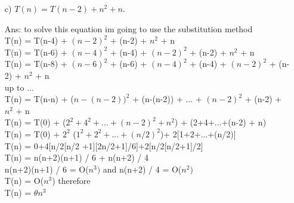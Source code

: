 \documentclass[10pt,letterpaper]{article}
\begin{document}
\begin{itemize}
\item[{c)}] $T(n)=T(n-2)+n^2 +n$.   
\item[Ans: ] to solve this equation im going to use the substitution method\\
T(n) = T(n-4) + $(n-2)^2$ + (n-2) + $n^2$ + n\\
T(n) = T(n-6) + $(n-4)^2$ + (n-4) + $(n-2)^2$ + (n-2) + $n^2$ + n\\
T(n) = T(n-8) + $(n-6)^2$ + (n-6) + $(n-4)^2$ + (n-4) + $(n-2)^2$ + (n-2) + $n^2$ + n\\
up to ...\\
T(n) = T(n-n) + ($n-(n-2))^2$ + (n-(n-2)) + ... + $(n-2)^2$ + (n-2) + $n^2$ + n\\
T(n) = T(0) + ($2^2 + 4^2 + ... + (n-2)^2 + n^2$) + (2+4+...+(n-2) + n)\\
T(n) = T(0) + $2^2$ ($1^2 + 2^2 + ... + (n/2)^2$)+ 2[1+2+...+(n/2)]\\
T(n) = 0+4[n/2[n/2 +1][2n/2+1]/6]+2[n/2[n/2+1]/2]\\

T(n) = n(n+2)(n+1) / 6 + n(n+2) / 4\\
n(n+2)(n+1) / 6 = O($n^3)$ and n(n+2) / 4 = O($n^2)$\\
T(n) = O($n^3$) therefore \\
T(n) = $\theta n^3$\\

\end{itemize}

\newpage
\end{document}
